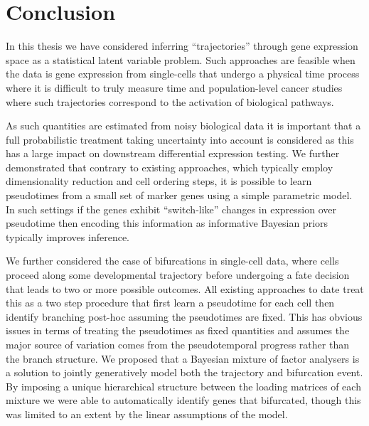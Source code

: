 \chapter{Conclusion}\label{ch:conclusionchap} %

In this thesis we have considered inferring ``trajectories'' through gene expression space as a statistical latent variable problem. Such approaches are feasible when the data is gene expression from single-cells that undergo a physical time process where it is difficult to truly measure time and population-level cancer studies where such trajectories correspond to the activation of biological pathways. 

As such quantities are estimated from noisy biological data it is important that a full probabilistic treatment taking uncertainty into account is considered as this has a large impact on downstream differential expression testing. We further demonstrated that contrary to existing approaches, which typically employ dimensionality reduction and cell ordering steps, it is possible to learn pseudotimes from a small set of marker genes using a simple parametric model. In such settings if the genes exhibit ``switch-like'' changes in expression over pseudotime then encoding this information as informative Bayesian priors typically improves inference.

We further considered the case of bifurcations in single-cell data, where cells proceed along some developmental trajectory before undergoing a fate decision that leads to two or more possible outcomes. All existing approaches to date treat this as a two step procedure that first learn a pseudotime for each cell then identify branching post-hoc assuming the pseudotimes are fixed. This has obvious issues in terms of treating the pseudotimes as fixed quantities and assumes the major source of variation comes from the pseudotemporal progress rather than the branch structure. We proposed that a Bayesian mixture of factor analysers is a solution to jointly generatively model both the trajectory and bifurcation event. By imposing a unique hierarchical structure between the loading matrices of each mixture we were able to automatically identify genes that bifurcated, though this was limited to an extent by the linear assumptions of the model.

